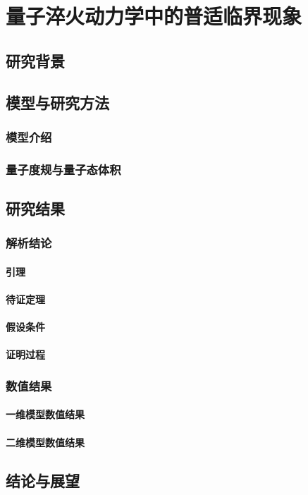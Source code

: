 
\chapter{量子淬火动力学中的普适临界现象}

	\section{研究背景}

	\section{模型与研究方法}
	
		\subsection{模型介绍}
		
		\subsection{量子度规与量子态体积}

	\section{研究结果}
	
		\subsection{解析结论}

			\subsubsection{引理}
			
			\subsubsection{待证定理}

			\subsubsection{假设条件}

			\subsubsection{证明过程}
			
		\subsection{数值结果}
		
			\subsubsection{一维模型数值结果}
			
			\subsubsection{二维模型数值结果}	

	\section{结论与展望}